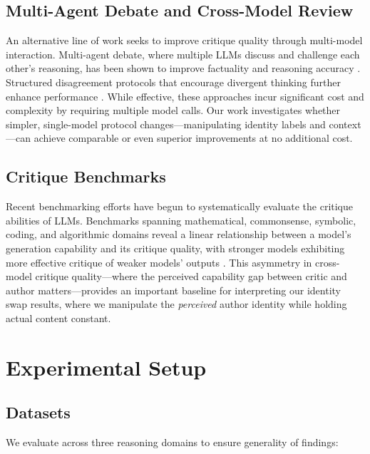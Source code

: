 \documentclass[11pt]{article}
\begin{document}
\subsection{Multi-Agent Debate and Cross-Model Review}

An alternative line of work seeks to improve critique quality through multi-model interaction. Multi-agent debate, where multiple LLMs discuss and challenge each other's reasoning, has been shown to improve factuality and reasoning accuracy \citep{du2023debate}. Structured disagreement protocols that encourage divergent thinking further enhance performance \citep{liang2023encouraging}. While effective, these approaches incur significant cost and complexity by requiring multiple model calls. Our work investigates whether simpler, single-model protocol changes---manipulating identity labels and context---can achieve comparable or even superior improvements at no additional cost.

\subsection{Critique Benchmarks}

Recent benchmarking efforts have begun to systematically evaluate the critique abilities of LLMs. Benchmarks spanning mathematical, commonsense, symbolic, coding, and algorithmic domains reveal a linear relationship between a model's generation capability and its critique quality, with stronger models exhibiting more effective critique of weaker models' outputs \citep{lin2024criticbench}. This asymmetry in cross-model critique quality---where the perceived capability gap between critic and author matters---provides an important baseline for interpreting our identity swap results, where we manipulate the \emph{perceived} author identity while holding actual content constant.

\section{Experimental Setup}
\label{sec:setup}

\subsection{Datasets}
\label{sec:datasets}

We evaluate across three reasoning domains to ensure generality of findings:
\end{document}
